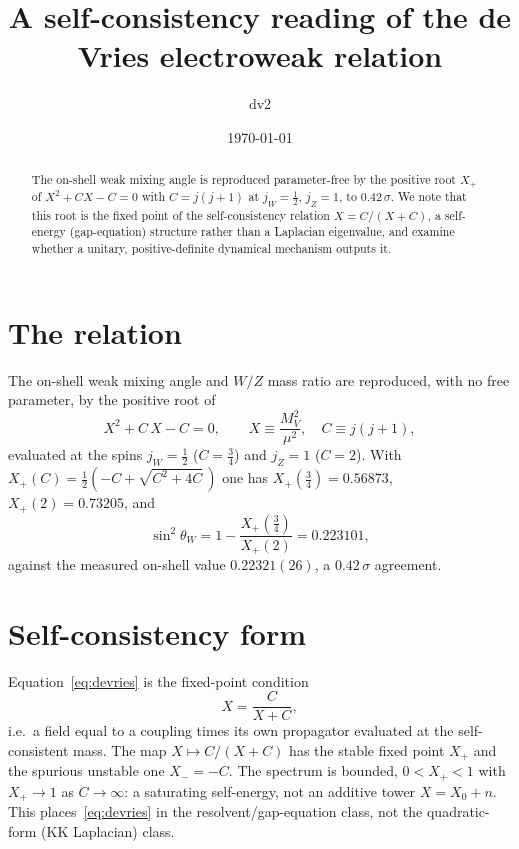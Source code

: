 \documentclass[11pt,aps,prd,nofootinbib]{revtex4-2}
\begin{document}
\title{A self-consistency reading of the de Vries electroweak relation}
\author{dv2}
\affiliation{}
\date{\today}

\begin{abstract}
The on-shell weak mixing angle is reproduced parameter-free by the positive root
$X_+$ of $X^2+CX-C=0$ with $C=j(j+1)$ at $j_W=\tfrac12$, $j_Z=1$, to
$0.42\,\sigma$. We note that this root is the fixed point of the self-consistency
relation $X=C/(X+C)$, a self-energy (gap-equation) structure rather than a
Laplacian eigenvalue, and examine whether a unitary, positive-definite dynamical
mechanism outputs it.
\end{abstract}

\maketitle

\section{The relation}
The on-shell weak mixing angle and $W/Z$ mass ratio are reproduced, with no free
parameter, by the positive root of
\begin{equation}
  X^2 + C\,X - C = 0, \qquad X \equiv \frac{M_V^2}{\mu^2}, \quad C \equiv j(j+1),
  \label{eq:devries}
\end{equation}
evaluated at the spins $j_W=\tfrac12$ ($C=\tfrac34$) and $j_Z=1$ ($C=2$). With
$X_+(C)=\tfrac12\!\left(-C+\sqrt{C^2+4C}\,\right)$ one has $X_+(\tfrac34)=0.56873$,
$X_+(2)=0.73205$, and
\begin{equation}
  \sin^2\theta_W = 1 - \frac{X_+(\tfrac34)}{X_+(2)} = 0.223101,
  \label{eq:sin2}
\end{equation}
against the measured on-shell value $0.22321(26)$, a $0.42\,\sigma$ agreement.

\section{Self-consistency form}
Equation~\eqref{eq:devries} is the fixed-point condition
\begin{equation}
  X = \frac{C}{X+C},
  \label{eq:selfcon}
\end{equation}
i.e.\ a field equal to a coupling times its own propagator evaluated at the
self-consistent mass. The map $X\mapsto C/(X+C)$ has the stable fixed point $X_+$
and the spurious unstable one $X_-=-C$. The spectrum is bounded, $0<X_+<1$ with
$X_+\to1$ as $C\to\infty$: a saturating self-energy, not an additive tower
$X=X_0+n$. This places~\eqref{eq:devries} in the resolvent/gap-equation class,
not the quadratic-form (KK Laplacian) class.
\end{document}
